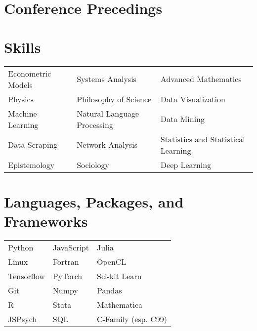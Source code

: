 \documentclass[10pt,a4paper,sans]{moderncv}
\begin{document}

\section{Conference Precedings}


\section{Skills}
\def\arraystretch{0}
\raggedleft
\begin{tabularx}{.9\textwidth}{>{\center\arraybackslash}X >{\center\arraybackslash}X >{\center\arraybackslash}X}
Econometric Models & Systems Analysis & Advanced Mathematics \\
Physics & Philosophy of Science & Data Visualization \\
Machine Learning & Natural Language Processing & Data Mining \\
Data Scraping & Network Analysis & Statistics and Statistical Learning \\
Epistemology & Sociology & Deep Learning
\end{tabularx}

\section{Languages, Packages, and Frameworks}
\def\arraystretch{0}
\raggedleft
\begin{tabularx}{.9\textwidth}{>{\center\arraybackslash}X >{\center\arraybackslash}X >{\center\arraybackslash}X}
Python & JavaScript & Julia \\
Linux & Fortran & OpenCL \\
Tensorflow & PyTorch & Sci-kit Learn \\
Git & Numpy & Pandas \\
R & Stata & Mathematica \\
JSPsych & SQL & C-Family (esp. C99)

\end{tabularx}
\end{document}
